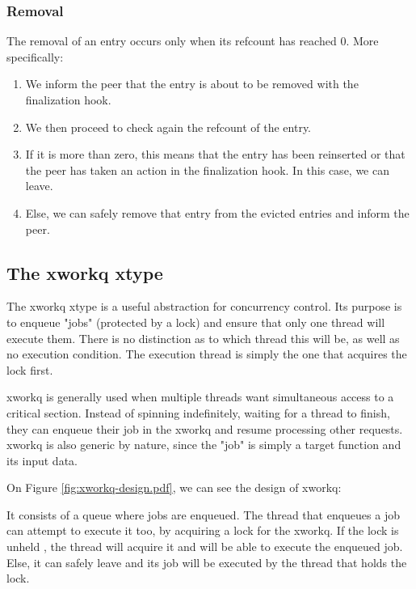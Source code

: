 \subsubsection{Removal}

The removal of an entry occurs only when its refcount has reached 0. More 
specifically:

\begin{enumerate}
	\item We inform the peer that the entry is about to be removed with the
		finalization hook.
	\item We then proceed to check again the refcount of the entry.
	\item If it is more than zero, this means that the entry has been 
		reinserted or that the peer has taken an action in the 
		finalization hook. In this case, we can leave.
	\item Else, we can safely remove that entry from the evicted entries and 
		inform the peer.
\end{enumerate}

\subsection{The xworkq xtype}\label{sec:xworkq-design}

The xworkq xtype is a useful abstraction for concurrency control. Its purpose 
is to enqueue "jobs" (protected by a lock) and ensure that only one thread will 
execute them. There is no distinction as to which thread this will be, as well 
as no execution condition. The execution thread is simply the one that acquires 
the lock first.

xworkq is generally used when multiple threads want simultaneous access to a 
critical section. Instead of spinning indefinitely, waiting for a thread to 
finish, they can enqueue their job in the xworkq and resume processing other 
requests. xworkq is also generic by nature, since the "job" is simply a target 
function and its input data.

On Figure \ref{fig:xworkq-design.pdf}, we can see the design of xworkq:


It consists of a queue where jobs are enqueued.  The thread that enqueues a job 
can attempt to execute it too, by acquiring a lock for the xworkq. If the lock 
is unheld%
, the thread will acquire it and will be able to execute the enqueued job.  
Else, it can safely leave and its job will be executed by the thread that holds 
the lock.

